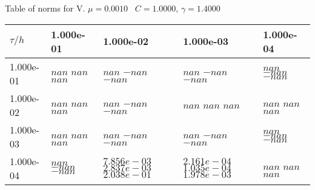 \begin{center}
Table of norms for V. $\mu = 0.0010$ \, $C = 1.0000$, $\gamma = 1.4000$
  
\begin{tabular}{|p{1in}|p{1in}|p{1in}|p{1in}|p{1in}|} \hline
$\tau / h$ &1.000e-01 &1.000e-02 &1.000e-03 &1.000e-04 \\ \hline 
1.000e-01 & $nan$  $nan$  $nan$  & $nan$  $-nan$  $-nan$  & $nan$  $-nan$  $-nan$  & $nan$  $-nan$  $-nan$  \\ \hline 
1.000e-02 & $nan$  $nan$  $nan$  & $nan$  $-nan$  $-nan$  & $nan$  $nan$  $nan$  & $nan$  $nan$  $nan$  \\ \hline 
1.000e-03 & $nan$  $nan$  $nan$  & $nan$  $-nan$  $-nan$  & $nan$  $-nan$  $-nan$  & $nan$  $-nan$  $-nan$  \\ \hline 
1.000e-04 & $nan$  $-nan$  $-nan$  & $7.856e-03$  $2.837e-03$  $2.038e-01$  & $2.161e-04$  $1.035e-04$  $1.978e-03$  & $nan$  $nan$  $nan$  \\ \hline 

\end{tabular}\\[20pt]
\end{center}
